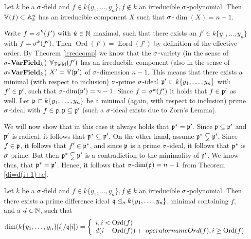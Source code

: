 \begin{cor}
Let $k$ be a $\sigma$-field and $f \in k\{y_1,\ldots,y_n\}, f \notin k$ an irreducible $\sigma$-polynomial. Then $\mathbb{V}(f) \subset \mathbb{A}_k^n$ has an irreducible component $X$ such that $\sigma$-$\dim(X) = n-1$.
\begin{bew}
Write $f = \sigma^k(f')$ with $k \in \mathbb{N}$ maximal, such that there exists an $f' \in k\{y_1,\ldots,y_n\}$ with $f = \sigma^k(f')$. Then $\operatorname{Ord}(f') = \operatorname{Eord}(f')$ by definition of the effective order. 
By Theorem \ref{irredcomp} we know that the $\sigma$-variety (in the sense of $\sigma\text{{\normalfont\textbf{-VarField}}}_k$) $ \mathbb{V}_{\operatorname{Field}}(f')$ has an irreducbile component (also in the sense of $\sigma\text{{\normalfont\textbf{-VarField}}}_k$) $X' = \mathbb{V}(\mathfrak{p}')$ of $\sigma$-dimension $n-1$.
This means that there exists a minimal (with respect to inclusion) $\sigma$-prime $\sigma$-ideal $\mathfrak{p}' \subset k\{y_1,\ldots,y_n\}$ with $f' \in \mathfrak{p}'$, such that $\sigma$-$\dim(\mathfrak{p}') = n-1$. 
Since $f = \sigma^k(f')$ it holds that $f \in \mathfrak{p}'$ as well. Let $\mathfrak{p} \subset k\{y_1,\ldots,y_n\}$ be a minimal (again, with respect to inclusion) prime $\sigma$-ideal with $f \in \mathfrak{p}, \mathfrak{p} \subseteq \mathfrak{p}'$ (such a $\sigma$-ideal exists due to Zorn's Lemma). 

We will now show that in this case it always holds that $\mathfrak{p}^* = \mathfrak{p}'$. Since $\mathfrak{p} \subseteq \mathfrak{p}'$ and $\mathfrak{p}'$ is radical, it follows that $\mathfrak{p}^* \subseteq \mathfrak{p}'$. On the other hand, assume $\mathfrak{p}^* \subsetneqq \mathfrak{p}'$. Since $f \in \mathfrak{p}$, it follows that $f' \in \mathfrak{p}^*$,
and since $\mathfrak{p}$ is a prime $\sigma$-ideal, it follows that $\mathfrak{p}^*$ is $\sigma$-prime. But then $\mathfrak{p}^* \subsetneqq \mathfrak{p}'$ is a contradiction to the minimality of $\mathfrak{p}'$. We know thus, that $\mathfrak{p}^* = \mathfrak{p}'$. Hence, it follows that $\sigma$-$\dim(\mathfrak{p}) = n -1$ from Theorem \ref{di=d(i+1)+e}.

\end{bew}
\end{cor}

\begin{lem}
Let $k$ be a $\sigma$-field and $f \in k\{y_1,\ldots,y_n\}, f \notin k$ an irreducible $\sigma$-polynomial. 
Then there exists a prime difference ideal $\mathfrak{q} \unlhd_{\sigma} k\{y_1,\ldots,y_n\}$, minimal containing $f$, and a $d \in \mathbb{N}$, such that 
$$\dim(k\{y_1,\ldots,y_n\}[i]/\mathfrak{q}[i]) = \left\{ \begin{array}{lr} i, i < \operatorname{Ord}(f) \\ d(i-\operatorname{Ord}(f)) +\ operatorname{Ord}(f),
 i \geq \operatorname{Ord}(f) \end{array} \right.$$
\end{lem}

